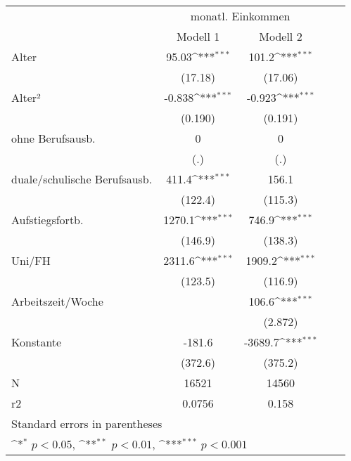 {
\def\sym#1{\ifmmode^{#1}\else\(^{#1}\)\fi}
\begin{tabular}{l*{2}{c}}
\hline\hline
                    &\multicolumn{2}{c}{monatl. Einkommen}&\multicolumn{2}{c}{} \\\cmidrule(lr){2-3}\cmidrule(lr){2-3}
                    &\multicolumn{1}{c}{Modell 1}&\multicolumn{1}{c}{Modell 2}\\
\hline
Alter               &       95.03\sym{***}&       101.2\sym{***}\\
                    &     (17.18)         &     (17.06)         \\
[1em]
Alter²              &      -0.838\sym{***}&      -0.923\sym{***}\\
                    &     (0.190)         &     (0.191)         \\
[1em]
ohne Berufsausb.    &           0         &           0         \\
                    &         (.)         &         (.)         \\
[1em]
duale/schulische Berufsausb.&       411.4\sym{***}&       156.1         \\
                    &     (122.4)         &     (115.3)         \\
[1em]
Aufstiegsfortb.     &      1270.1\sym{***}&       746.9\sym{***}\\
                    &     (146.9)         &     (138.3)         \\
[1em]
Uni/FH              &      2311.6\sym{***}&      1909.2\sym{***}\\
                    &     (123.5)         &     (116.9)         \\
[1em]
Arbeitszeit/Woche   &                     &       106.6\sym{***}\\
                    &                     &     (2.872)         \\
[1em]
Konstante           &      -181.6         &     -3689.7\sym{***}\\
                    &     (372.6)         &     (375.2)         \\
\hline
N                   &       16521         &       14560         \\
r2                  &      0.0756         &       0.158         \\
\hline\hline
\multicolumn{3}{l}{\footnotesize Standard errors in parentheses}\\
\multicolumn{3}{l}{\footnotesize \sym{*} \(p<0.05\), \sym{**} \(p<0.01\), \sym{***} \(p<0.001\)}\\
\end{tabular}
}
